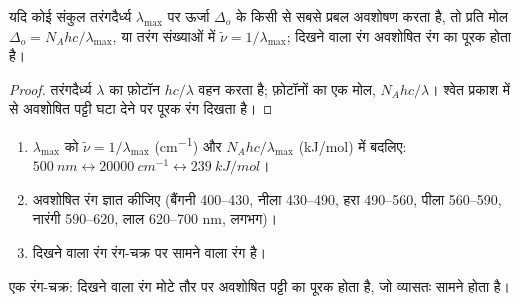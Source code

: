 \begin{proposition}[रंग से विपाटन]\label{prop:b2:ligand-field:colour}
यदि कोई संकुल तरंगदैर्ध्य $\lambda_{\max}$ पर ऊर्जा $\Delta_o$ के किसी  से
सबसे प्रबल अवशोषण करता है, तो प्रति मोल $\Delta_o = N_Ahc/\lambda_{\max}$, या तरंग संख्याओं में $\tilde\nu = 1/\lambda_{\max}$;
दिखने वाला रंग अवशोषित रंग का पूरक होता है।
\end{proposition}

\begin{proof}
तरंगदैर्ध्य $\lambda$ का फ़ोटॉन $hc/\lambda$ वहन करता है; फ़ोटॉनों का एक मोल, $N_Ahc/\lambda$। श्वेत
प्रकाश में से अवशोषित पट्टी घटा देने पर पूरक रंग दिखता है।
\end{proof}

\begin{method}[अवशोषण पट्टी से रंग तक]\label{met:b2:ligand-field:colour}
\begin{enumerate}
  \item $\lambda_{\max}$ को $\tilde\nu = 1/\lambda_{\max}$ (\unit{cm^{-1}}) और
        $N_Ahc/\lambda_{\max}$ (\unit{kJ/mol}) में बदलिए: $\qty{500}{nm} \leftrightarrow \qty{20000}{cm^{-1}}
        \leftrightarrow \qty{239}{kJ/mol}$।
  \item अवशोषित रंग ज्ञात कीजिए (बैंगनी 400--430, नीला 430--490, हरा 490--560, पीला
        560--590, नारंगी 590--620, लाल 620--700 nm, लगभग)।
  \item दिखने वाला रंग रंग-चक्र पर सामने वाला रंग है।
\end{enumerate}
\end{method}

\begin{omfigure}

{\small एक रंग-चक्र: दिखने वाला रंग मोटे तौर पर अवशोषित पट्टी का पूरक होता है, जो
व्यासतः सामने होता है।}
\end{omfigure}

